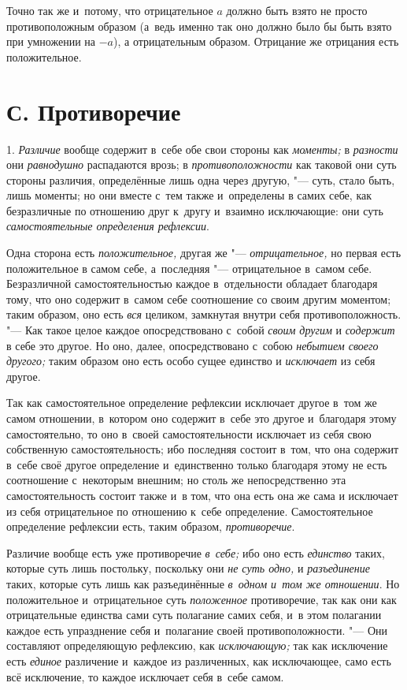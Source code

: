 Точно так же и~потому, что отрицательное $a$ должно
быть взято не просто противоположным образом (а~ведь именно так оно должно
было бы быть взято при умножении на $-a$), а
отрицательным образом. Отрицание же отрицания есть положительное.

\section[С. Противоречие]{С. Противоречие}
1. {\em Различие} вообще содержит в~себе обе свои стороны
как {\em моменты;} в {\em разности} они {\em равнодушно}
распадаются врозь; в {\em противоположности} как
таковой они суть стороны различия, определённые лишь одна через другую, "---
суть, стало быть, лишь моменты; но они вместе с~тем также и~определены в
самих себе, как безразличные по отношению друг к~другу и~взаимно
исключающие: они суть {\em самостоятельные определения рефлексии}.

Одна сторона есть {\em положительное,} другая же
"--- {\em отрицательное,} но первая есть положительное в
самом себе, а~последняя "--- отрицательное в~самом себе. Безразличной
самостоятельностью каждое в~отдельности обладает благодаря тому, что оно
содержит в~самом себе соотношение со своим другим моментом; таким образом,
оно есть {\em вся} целиком, замкнутая внутри себя
противоположность. "--- Как такое целое каждое опосредствовано с~собой
{\em своим другим} и {\em содержит}
в себе это другое. Но оно, далее, опосредствовано с~собою
{\em небытием своего другого;} таким образом оно есть
особо сущее единство и {\em исключает} из себя другое.

Так как самостоятельное определение рефлексии исключает другое в~том же
самом отношении, в~котором оно содержит в~себе это другое и~благодаря этому
самостоятельно, то оно в~своей самостоятельности исключает из себя свою
собственную самостоятельность; ибо последняя состоит в~том, что она
содержит в~себе своё другое определение и~единственно только благодаря
этому не есть соотношение с~некоторым внешним; но столь же непосредственно
эта самостоятельность состоит также и~в том, что она есть она же сама и
исключает из себя отрицательное по отношению к~себе определение.
Самостоятельное определение рефлексии есть, таким образом, {\em противоречие}.

Различие вообще есть уже противоречие {\em в~себе;} ибо
оно есть {\em единство} таких, которые суть лишь
постольку, поскольку они {\em не суть одно,} и
{\em разъединение} таких, которые суть лишь как
разъединённые {\em в~одном и~том же отношении}. Но
положительное и~отрицательное суть {\em положенное}
противоречие, так как они как отрицательные единства сами суть полагание
самих себя, и~в этом полагании каждое есть упразднение себя и~полагание
своей противоположности. "--- Они составляют определяющую рефлексию, как
{\em исключающую;} так как исключение есть
{\em единое} различение и~каждое из различенных, как
исключающее, само есть всё исключение, то каждое исключает себя в~себе самом.

